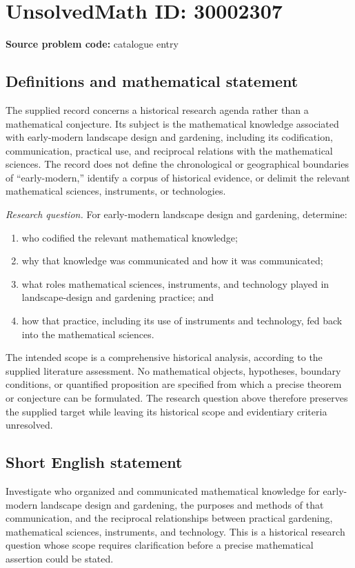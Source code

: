 \documentclass[11pt]{article}
\begin{document}
\section*{UnsolvedMath ID: 30002307}
\textbf{Source problem code:} catalogue entry
\subsection{Definitions and mathematical statement}
The supplied record concerns a historical research agenda rather than a mathematical conjecture. Its subject is the mathematical knowledge associated with early-modern landscape design and gardening, including its codification, communication, practical use, and reciprocal relations with the mathematical sciences. The record does not define the chronological or geographical boundaries of ``early-modern,'' identify a corpus of historical evidence, or delimit the relevant mathematical sciences, instruments, or technologies.

\emph{Research question.} For early-modern landscape design and gardening, determine:
\begin{enumerate}
\item who codified the relevant mathematical knowledge;
\item why that knowledge was communicated and how it was communicated;
\item what roles mathematical sciences, instruments, and technology played in landscape-design and gardening practice; and
\item how that practice, including its use of instruments and technology, fed back into the mathematical sciences.
\end{enumerate}
The intended scope is a comprehensive historical analysis, according to the supplied literature assessment. No mathematical objects, hypotheses, boundary conditions, or quantified proposition are specified from which a precise theorem or conjecture can be formulated. The research question above therefore preserves the supplied target while leaving its historical scope and evidentiary criteria unresolved.
\subsection{Short English statement}
Investigate who organized and communicated mathematical knowledge for early-modern landscape design and gardening, the purposes and methods of that communication, and the reciprocal relationships between practical gardening, mathematical sciences, instruments, and technology. This is a historical research question whose scope requires clarification before a precise mathematical assertion could be stated.
\end{document}
